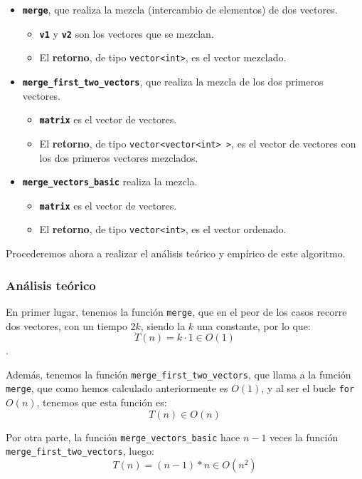 \documentclass[10pt, a4paper]{article}
\theoremstyle{theorem-style}
\theoremstyle{theorem-style}
\theoremstyle{definition-style}
\theoremstyle{remark-style}
\theoremstyle{example-style}
\theoremstyle{definition-style}
\theoremstyle{remark-style}
\begin{document}
\begin{itemize}
	\item \textbf{\texttt{merge}}, que realiza la mezcla (intercambio de elementos) de dos vectores.
	\begin{itemize}
		\item \textbf{\texttt{v1}} y \textbf{\texttt{v2}} son los vectores que se mezclan.
		\item El \textbf{retorno}, de tipo \texttt{vector<int>}, es el vector mezclado.
	\end{itemize}
	\item \textbf{\texttt{merge\_first\_two\_vectors}}, que realiza la mezcla de los dos primeros vectores.
	\begin{itemize}
		\item \textbf{\texttt{matrix}} es el vector de vectores.
		\item El \textbf{retorno}, de tipo \texttt{vector<vector<int> >}, es el vector de vectores con los dos primeros vectores mezclados.
	\end{itemize}
	\item \textbf{\texttt{merge\_vectors\_basic}} realiza la mezcla.
	\begin{itemize}
		\item \textbf{\texttt{matrix}} es el vector de vectores.
		\item El \textbf{retorno}, de tipo \texttt{vector<int>}, es el vector ordenado.
	\end{itemize}
\end{itemize}

Procederemos ahora a realizar el análisis teórico y empírico de este algoritmo.

\subsubsection{Análisis teórico}

En primer lugar, tenemos la función \texttt{merge}, que en el peor de los casos recorre dos vectores, con un tiempo $2k$, siendo la $k$ una constante, por lo que:
$$T(n) = k·1 \in O(1)$$.

Además, tenemos la función \texttt{merge\_first\_two\_vectors}, que llama a la función \texttt{merge}, que como hemos calculado anteriormente es $O(1)$, y al ser el bucle \texttt{for} $O(n)$, tenemos que esta función es:
$$ T(n) \in O(n)$$

Por otra parte, la función \texttt{merge\_vectors\_basic} hace $n-1$ veces la función \texttt{merge\_first\_two\_vectors}, luego:
$$T(n) = (n-1)*n \in O(n^2)$$
\end{document}
